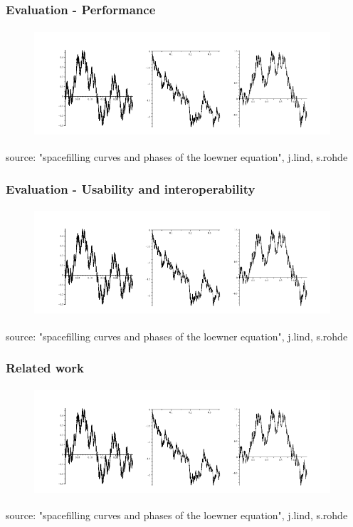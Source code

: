 \documentclass[10pt, compress]{beamer}
\begin{document}
\begin{frame}[fragile]
  \frametitle{Evaluation - Performance}

  

\begin{figure}
  \centering
 \includegraphics[width=11cm,height=4cm]{intro2.png}
\end{figure}
\tiny
source: "spacefilling curves and phases of the loewner equation", j.lind, s.rohde
\normalsize
\end{frame}

\begin{frame}[fragile]
  \frametitle{Evaluation - Usability and interoperability}

  

\begin{figure}
  \centering
 \includegraphics[width=11cm,height=4cm]{intro2.png}
\end{figure}
\tiny
source: "spacefilling curves and phases of the loewner equation", j.lind, s.rohde
\normalsize
\end{frame}


\begin{frame}[fragile]
  \frametitle{Related work}

  

\begin{figure}
  \centering
 \includegraphics[width=11cm,height=4cm]{intro2.png}
\end{figure}
\tiny
source: "spacefilling curves and phases of the loewner equation", j.lind, s.rohde
\normalsize
\end{frame}
\end{document}
